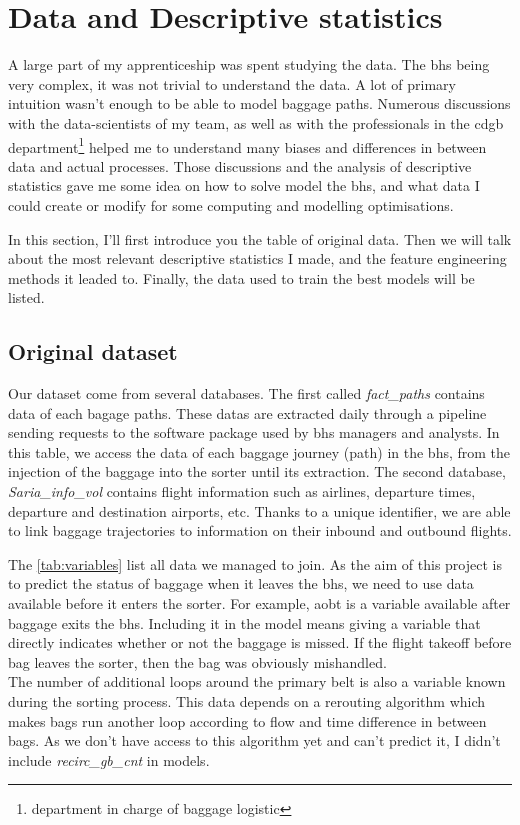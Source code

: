 \documentclass[12pt]{article}
\begin{document}
\newpage
\section{Data and Descriptive statistics}

A large part of my apprenticeship was spent studying the data. The \acrlong{bhs} being very complex, it was not trivial to understand the data. A lot of primary intuition wasn't enough to be able to model baggage paths. Numerous discussions with the data-scientists of my team, as well as with the professionals in the \acrshort{cdgb} department\footnote{department in charge of baggage logistic} helped me to understand many biases and differences in between data and actual processes. Those discussions and the analysis of descriptive statistics gave me some idea on how to solve model the \acrshort{bhs}, and what data I could create or modify for some computing and modelling optimisations. 

In this section, I'll first introduce you the table of original data. Then we will talk about the most relevant descriptive statistics I made, and the feature engineering methods it leaded to. Finally, the data used to train the best models will be listed.


\subsection{Original dataset}

Our dataset come from several databases. The first called \textit{fact\_paths} contains data of each bagage paths. These datas are extracted daily through a pipeline sending requests to the software package used by \acrshort{bhs} managers and analysts. In this table, we access the data of each baggage journey (path) in the \acrshort{bhs}, from the injection of the baggage into the sorter until its extraction.
The second database, \textit{Saria\_info\_vol} contains flight information such as airlines, departure times, departure and destination airports, etc. Thanks to a unique identifier, we are able to link baggage trajectories to information on their inbound and outbound flights. \hfill \break

\indent The \autoref{tab:variables} list all data we managed to join. As the aim of this project is to predict the status of baggage when it leaves the \acrshort{bhs}, we need to use data available before it enters the sorter. For example, \acrshort{aobt} is a variable available after baggage exits the \acrshort{bhs}. Including it in the model means giving a variable that directly indicates whether or not the baggage is missed. If the flight takeoff before bag leaves the sorter, then the bag was obviously mishandled.\\ 
The number of additional loops around the primary belt is also a variable known during the sorting process. This data depends on a rerouting algorithm which makes bags run another loop according to flow and time difference in between bags. As we don't have access to this algorithm yet and can't predict it, I didn't include \textit{recirc\_gb\_cnt} in models.
\end{document}

